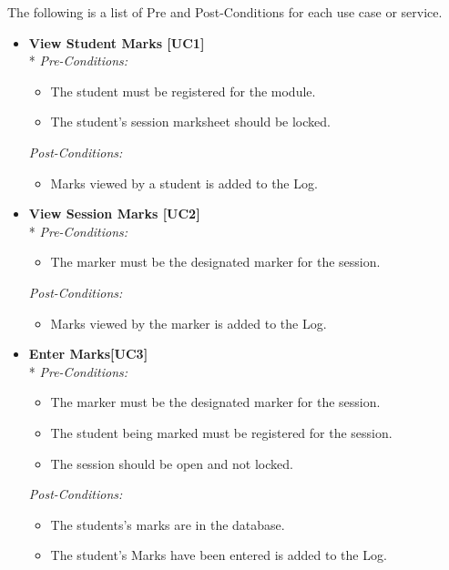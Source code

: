 \documentclass[a4paper]{article}
\begin{document}
			The following is a list of Pre and Post-Conditions for each use case or service.
			\begin{itemize}
			
				\item 	\textbf{View Student Marks [UC1]}\\*
						\textit{Pre-Conditions:}
								\begin{itemize}
									\item The student must be registered for the module.
									\item The student's session marksheet should be locked.
								\end{itemize}
								
						\textit{Post-Conditions:}
								\begin{itemize}
									\item Marks viewed by a student is added to the Log.
								\end{itemize}
														
				\item	\textbf{View Session Marks [UC2]}\\*
						\textit{Pre-Conditions:}
								\begin{itemize}
									\item The marker must be the designated marker for the session.
								\end{itemize}
								
						\textit{Post-Conditions:}
								\begin{itemize}
									\item Marks viewed by the marker is added to the Log.
								\end{itemize}
														
				\item	\textbf{Enter Marks[UC3]}\\*
						\textit{Pre-Conditions:}
								\begin{itemize}
									\item The marker must be the designated marker for the session.
									\item The student being marked must be registered for the session.
									\item The session should be open and not locked.
								\end{itemize}
								
						\textit{Post-Conditions:}
								\begin{itemize}
									\item The students's marks are in the database.
									\item The student's Marks have been entered is added to the Log.
								\end{itemize}
														

\end{itemize}
\end{document}
